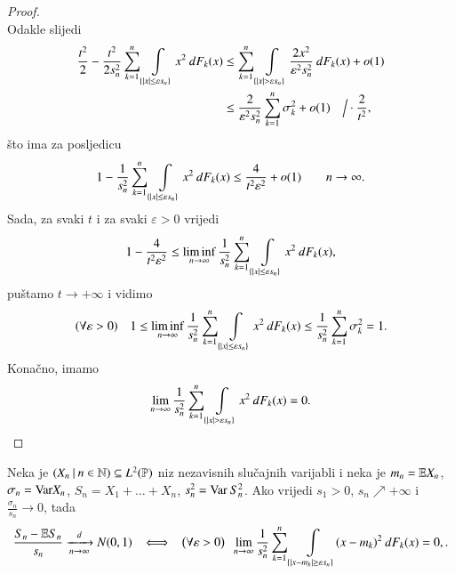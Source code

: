 \begin{proof}
\begin{equation*}
    \end{equation*}
    Odakle slijedi
    \begin{equation*}
        \begin{aligned}
            \frac{t^2}{2} - \frac{t^2}{2 s_n^2} \sum\limits_{k = 1}^{n} \int\limits_{\{ |x| \leq \varepsilon s_n \}} x^2 \: d F_k (x) &\leq \sum\limits_{k = 1}^{n} \int\limits_{\{ |x| > \varepsilon s_n \}} \frac{2 x^2}{\varepsilon^2 s_n^2} \: d F_k (x) + o(1)\\
            &\leq \frac{2}{\varepsilon^2 s_n^2} \sum\limits_{k = 1}^{n} \sigma_k^2 + o (1) \quad \Big/ \cdot \frac{2}{t^2},
        \end{aligned}
    \end{equation*}
    \v sto ima za posljedicu
    \begin{equation*}
        1 - \frac{1}{s_n^2} \sum\limits_{k = 1}^{n} \int\limits_{\{ |x| \leq \varepsilon s_n \}} x^2 \: d F_k (x) \leq \frac{4}{t^2 \varepsilon^2} + o(1) \quad \quad n \to \infty.
    \end{equation*}
    Sada, za svaki $t$ i za svaki $\varepsilon > 0$ vrijedi
    \begin{equation*}
        1 - \frac{4}{t^2 \varepsilon^2} \leq \liminf_{n \to \infty} \frac{1}{s_n^2} \sum\limits_{k = 1}^{n} \int\limits_{\{ |x| \leq \varepsilon s_n \}} x^2 \: d F_k (x),
    \end{equation*}
    pu\v stamo $t \to +\infty$ i vidimo
    \begin{equation*}
        (\forall \varepsilon > 0) \quad 1 \leq \liminf\limits_{n \to \infty} \frac{1}{s_n^2} \sum\limits_{k = 1}^{n} \int\limits_{\{ |x| \leq \varepsilon s_n \}} x^2 \: d F_k (x) \leq \frac{1}{s_n^2} \sum\limits_{k = 1}^{n} \sigma_k^2 = 1.
    \end{equation*}
    Kona\v cno, imamo
    \begin{equation*}
        \lim\limits_{n \to \infty} \frac{1}{s_n^2} \sum\limits_{k = 1}^{n} \int\limits_{\{ |x| > \varepsilon s_n \}} x^2 \: d F_k (x) = 0.
    \end{equation*}
\end{proof}

\begin{kor}  \label{kor:19.13}
    Neka je $({X_n} \: | \: {n \in \mathbb{N}}) \subseteq L^2 (\mathbb{P})$ niz nezavisnih slu\v cajnih varijabli i neka je $m_n = \mathbb{E} X_n$, $\sigma_n = \mathrm{Var} X_n$, $S_n = X_1 + \ldots + X_n$, $s_n^2 = \mathrm{Var} \: S_n^2$.
    Ako vrijedi $s_1 > 0$, $s_n \nearrow +\infty$ i $\frac{\sigma_n}{s_n} \to 0$, tada
    \begin{equation*}
        \frac{S_n - \mathbb{E} S_n}{s_n} \xrightarrow[n \to \infty]{d} N(0, 1) \; \; \iff \; \; \big( \forall \varepsilon > 0 \big) \; \; \lim\limits_{n \to \infty} \frac{1}{s_n^2} \sum\limits_{k = 1}^{n} \int\limits_{\{ |x - m_k| \geq \varepsilon s_n \}} (x - m_k)^2 \: d F_k (x) = 0, .
    \end{equation*}
\end{kor}

